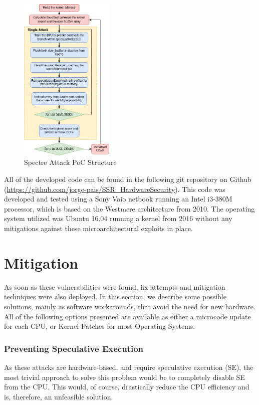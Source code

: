 \documentclass[conference]{IEEEtran}
\begin{document}
\begin{figure}[h]
  \centering
  \includegraphics[width=0.4\textwidth]{figures/spectreAttackDiagram.png}
  \caption{Spectre Attack PoC Structure}
  \label{fig:spectreFlowchart}
\end{figure}

All of the developed code can be found in the following git repository on Github (\href{https://github.com/jorge-pais/SSR\_HardwareSecurity}{https://github.com/jorge-pais/SSR\_HardwareSecurity}). This code was developed and tested using a Sony Vaio netbook running an Intel i3-380M processor, which is based on the Westmere architecture from 2010. The operating system utilized was Ubuntu 16.04 running a kernel from 2016 without any mitigations against these microarchitectural exploits in place.



\section{Mitigation}
As soon as these vulnerabilities were found, fix attempts and mitigation techniques were also  deployed. In this section, we describe some possible solutions, mainly as software workarounds, that avoid the need for new hardware. All of the following options presented are available as either a microcode update for each CPU, or Kernel Patches for most Operating Systems.
\subsubsection{Preventing Speculative Execution}
As these attacks are hardware-based, and require speculative execution (SE), the most trivial approach to solve this problem would be to completely disable SE from the CPU. This would, of course, drastically reduce the CPU efficiency and is, therefore, an unfeasible solution.
\end{document}
